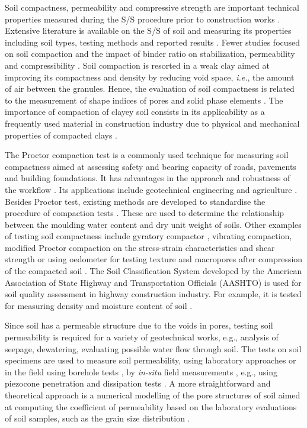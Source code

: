 \documentclass{amestyle}
\begin{document}
Soil compactness, permeability and compressive strength are important technical properties measured during the S/S procedure prior to construction works \cite{LindhWinter,XU2021114774}. Extensive literature is available on the S/S of soil and measuring its properties including soil types, testing methods and reported results \cite{Anagnostopoulos,Kallenetal2016,Lemenkov2021a,HUANG2022115452}. Fewer studies focused on soil compaction and the impact of binder ratio on stabilization, permeability and compressibility \cite{Kongkitkul,Leeetal2007}. Soil compaction is resorted in a weak clay aimed at improving its compactness and density by reducing void space, \emph{i.e.}, the amount of air between the granules. Hence, the evaluation of soil compactness is related to the measurement of shape indices of pores and solid phase elements \cite{Bryk}. The importance of compaction of clayey soil consists in its applicability as a frequently used material in construction industry due to physical and mechanical properties of compacted clays \cite{Zou}. 

The Proctor compaction test is a commonly used technique for measuring soil compactness aimed at assessing safety and bearing capacity of roads, pavements and building foundations. It has advantages in the approach and robustness of the workflow \cite{Wasman,Matteo,Boudlal}. Its applications include geotechnical engineering \cite{Barden,Jibon} and agriculture \cite{ARAGON2000197,Bayat,Nhantumbo,ALAOUI20111}. Besides Proctor test, existing methods are developed to standardise the procedure of compaction tests \cite{ASTM2007,ASTM2009}. These are used to determine the relationship between the moulding water content and dry unit weight of soils. Other examples of testing soil compactness include gyratory compactor \cite{Leeetal2007}, vibrating compaction, modified Proctor compaction on the stress-strain characteristics and shear strength \cite{Long} or using oedometer for testing texture and macropores after compression of the compacted soil \cite{Alaoui}. The Soil Classification System developed by the American Association of State Highway and Transportation Officials (AASHTO) is used for soil quality assessment in highway construction industry. For example, it is tested for measuring density and moisture content of soil \cite{Livneh}. 

Since soil has a permeable structure due to the voids in pores, testing soil permeability is required for a variety of geotechnical works, e.g., analysis of seepage, dewatering, evaluating possible water flow through soil. The tests on soil specimens are used to measure soil permeability, using laboratory approaches \cite{ELHAKIM20162631} or in the field using borehole tests \cite{YU2022127817}, by \emph{in-situ} field measurements \cite{ZHOU201999}, e.g., using piezocone penetration and dissipation tests \cite{TAKAI2016277,LIM2019189}. A more straightforward and theoretical approach is a numerical modelling of the pore structures of soil aimed at computing the coefficient of permeability based on the laboratory evaluations of soil samples, such as the grain size distribution \cite{LIU2021104468}.
\end{document}
